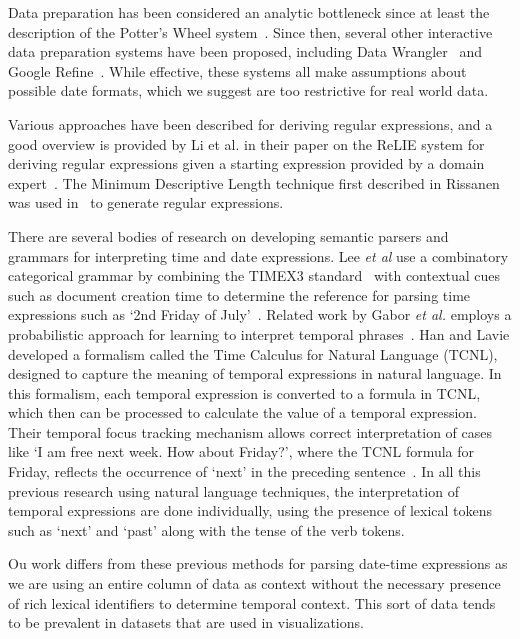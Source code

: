 
Data preparation has been considered an analytic bottleneck since at least the description of the Potter's Wheel system~\cite{Raman:2001}. Since then, several other interactive data preparation systems have been proposed, including Data Wrangler~\cite{Kandel:2011} and Google Refine~\cite{Refine}. While effective, these systems all make assumptions about possible date formats, which we suggest are too restrictive for real world data.

Various approaches have been described for deriving regular expressions, and a good overview is provided by Li et al. in their paper on the ReLIE system for deriving regular expressions given a starting expression provided by a domain expert~\cite{Li:2008}. The Minimum Descriptive Length technique first described in Rissanen~\cite{Rissanen:1978} was used in~\cite{Raman:2001} to generate regular expressions. 

There are several bodies of research on developing semantic parsers and grammars for interpreting time and date expressions. Lee \textit{et al} use a combinatory categorical grammar by combining the TIMEX3 standard~\cite{timex3} with contextual cues such as document creation time to determine the reference for parsing time expressions such as `2nd Friday of July'~\cite{LeeADZ14}. Related work by Gabor \textit{et al.} employs a probabilistic approach for learning to interpret temporal phrases~\cite{Angeli:2012}. Han and Lavie developed a formalism called the Time Calculus for Natural Language (TCNL), designed to capture the meaning of temporal expressions in natural language. In this formalism, each temporal expression is converted to a formula in TCNL, which then can be processed to calculate the value of a temporal expression. Their temporal focus tracking mechanism allows correct interpretation of cases like `I am free next week. How
about Friday?', where the TCNL formula for Friday, reflects the occurrence of `next' in the preceding sentence~\cite{Han:2004}.  In all this previous research using natural language techniques, the interpretation of temporal expressions are done individually, using the presence of lexical tokens such as `next' and `past' along with the tense of the verb tokens.

Ou work differs from these previous methods for parsing date-time expressions as we are using an entire column of data as context without the necessary presence of rich lexical identifiers to determine temporal context. This sort of data tends to be prevalent in datasets that are used in visualizations. 


